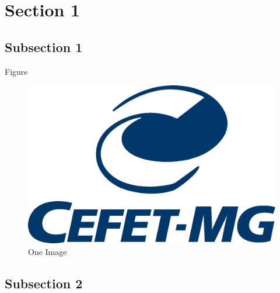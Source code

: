 
\section{Section 1}
\subsection{Subsection 1}

\begin{slide}{Figure}
    \vspace*{\fill}
    \begin{figure}[ht!]
        \centering
        \captionsetup{justification=centering}
        \includegraphics[height=0.3\textheight]{imgs/cefet}
        \caption{One Image}
    \end{figure}
    \vspace*{\fill}
\end{slide}

\subsection{Subsection 2}

